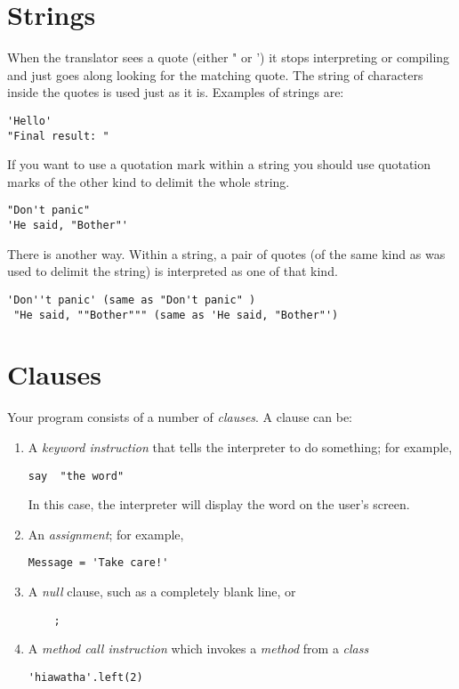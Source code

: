 {\section{Strings}
When the translator sees a quote (either " or ') it stops
interpreting or compiling and just goes along looking for the matching quote. The
string of characters inside the quotes is used just as it is. Examples
of strings are:
\begin{verbatim}
'Hello'
"Final result: "
\end{verbatim}
If you want to use a quotation mark within a string you should use
quotation marks of the other kind to delimit the whole string.
\begin{verbatim}
"Don't panic"
'He said, "Bother"'
\end{verbatim}
There is another way. Within a string, a pair of quotes (of the same
kind as was used to delimit the string) is interpreted as one of that
kind.
\begin{verbatim}
'Don''t panic' (same as "Don't panic" )
 "He said, ""Bother""" (same as 'He said, "Bother"')
\end{verbatim}
\section{Clauses}
Your \nr{} program consists of a number of \emph{clauses}. A clause
can be:
\begin{enumerate}
 \item A \emph{keyword instruction} that tells the interpreter to do something; for
   example,
\begin{verbatim}
say  "the word"
\end{verbatim}
In this case, the interpreter will display the word on the user's
screen. 
\item An \emph{assignment}; for example,
\begin{verbatim}
Message = 'Take care!'
\end{verbatim}
\item A \emph{null} clause, such as a completely blank line, or
\begin{verbatim}
    ;
\end{verbatim}
\item A \emph{method call instruction} which invokes a \emph{method}
    from a \emph{class}
\begin{verbatim}
'hiawatha'.left(2)
\end{verbatim}
\end{enumerate}
}
